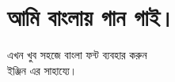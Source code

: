 \documentclass{report}
\begin{document}
 
\chapter{আমি বাংলায় গান গাই। }
এখন খুব সহজে বাংলা ফন্ট ব্যবহার করুন\\ 
ইঞ্জিন এর সাহায্যে।\\
\end{document}
